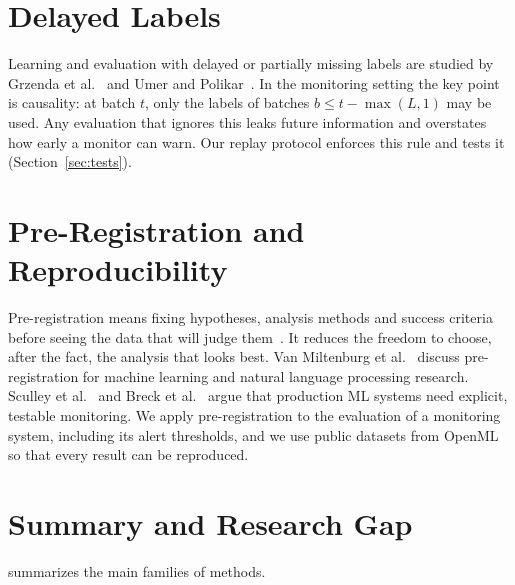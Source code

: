 \section{Delayed Labels}
Learning and evaluation with delayed or partially missing labels are studied by Grzenda et al.~\cite{grzenda2020delayed} and Umer and Polikar~\cite{umer2020evl}. In the monitoring setting the key point is causality: at batch $t$, only the labels of batches $b \le t-\max(L,1)$ may be used. Any evaluation that ignores this leaks future information and overstates how early a monitor can warn. Our replay protocol enforces this rule and tests it (Section~\ref{sec:tests}).

\section{Pre-Registration and Reproducibility}
Pre-registration means fixing hypotheses, analysis methods and success criteria before seeing the data that will judge them~\cite{nosek2018prereg}. It reduces the freedom to choose, after the fact, the analysis that looks best. Van Miltenburg et al.~\cite{vanmiltenburg2021prereg} discuss pre-registration for machine learning and natural language processing research. Sculley et al.~\cite{sculley2015debt} and Breck et al.~\cite{breck2017mltest} argue that production ML systems need explicit, testable monitoring. We apply pre-registration to the evaluation of a monitoring system, including its alert thresholds, and we use public datasets from OpenML~\cite{vanschoren2014openml} so that every result can be reproduced.

\section{Summary and Research Gap}
 summarizes the main families of methods.

